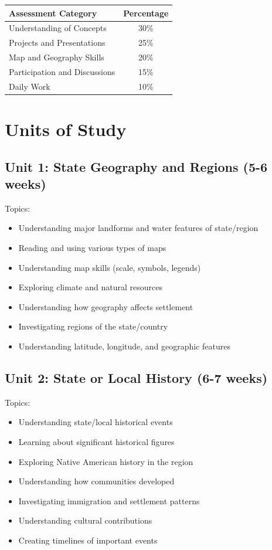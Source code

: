 \documentclass[11pt,letterpaper]{report}
\begin{document}
\begin{center}
\begin{tabular}{|l|c|}
\hline
\textbf{Assessment Category} & \textbf{Percentage} \\
\hline
Understanding of Concepts & 30\% \\
\hline
Projects and Presentations & 25\% \\
\hline
Map and Geography Skills & 20\% \\
\hline
Participation and Discussions & 15\% \\
\hline
Daily Work & 10\% \\
\hline
\end{tabular}
\end{center}

\section{Units of Study}

\subsection{Unit 1: State Geography and Regions (5-6 weeks)}

Topics:
\begin{itemize}
\item Understanding major landforms and water features of state/region
\item Reading and using various types of maps
\item Understanding map skills (scale, symbols, legends)
\item Exploring climate and natural resources
\item Understanding how geography affects settlement
\item Investigating regions of the state/country
\item Understanding latitude, longitude, and geographic features
\end{itemize}

\subsection{Unit 2: State or Local History (6-7 weeks)}

Topics:
\begin{itemize}
\item Understanding state/local historical events
\item Learning about significant historical figures
\item Exploring Native American history in the region
\item Understanding how communities developed
\item Investigating immigration and settlement patterns
\item Understanding cultural contributions
\item Creating timelines of important events
\end{itemize}
\end{document}
